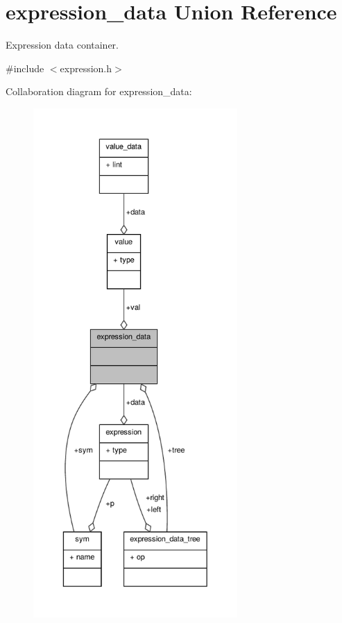 \hypertarget{unionexpression__data}{\section{expression\+\_\+data Union Reference}
\label{unionexpression__data}
}


Expression data container.  




{\ttfamily \#include $<$expression.\+h$>$}



Collaboration diagram for expression\+\_\+data\+:\nopagebreak
\begin{figure}[H]
\begin{center}
\leavevmode
\includegraphics[height=550pt]{unionexpression__data__coll__graph}
\end{center}
\end{figure}
